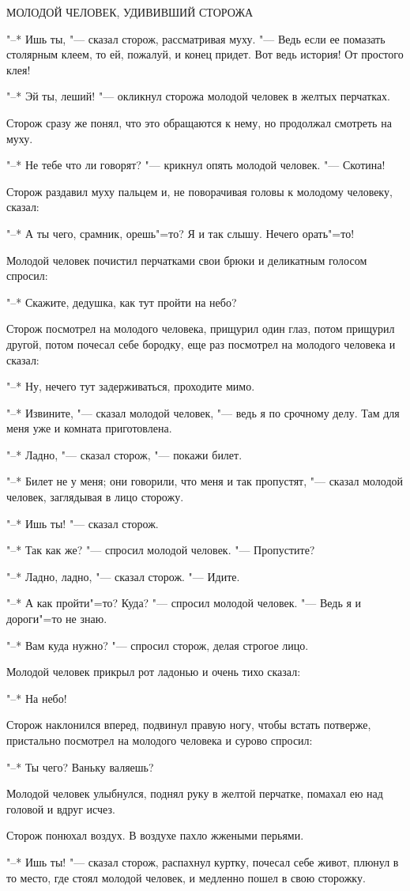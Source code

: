 МОЛОДОЙ  ЧЕЛОВЕК, УДИВИВШИЙ СТОРОЖА 

    "--* Ишь ты, "--- сказал сторож,  рассматривая 
муху. "--- Ведь если ее помазать столярным клеем, 
то ей, пожалуй, и конец придет. Вот ведь
история! От простого клея! 

    "--* Эй ты, леший! "--- окликнул сторожа молодой 
человек в желтых перчатках.

    Сторож сразу же понял, что это обращаются 
к нему, но продолжал смотреть на
муху. 

    "--* Не  тебе что  ли  говорят?  "---  крикнул
опять молодой человек. "--- Скотина! 

    Сторож раздавил муху пальцем и, не поворачивая 
головы к молодому человеку, сказал:

    "--* А ты чего, срамник, орешь"=то?  Я и так
слышу. Нечего орать"=то! 

    Молодой человек почистил перчатками свои
брюки и деликатным голосом спросил:

    "--* Скажите,  дедушка,  как  тут пройти на
небо? 

    Сторож  посмотрел  на молодого человека,
прищурил один глаз,  потом  прищурил другой,
потом почесал  себе бородку, еще раз посмотрел 
на молодого человека и сказал: 

    "--* Ну, нечего тут задерживаться, проходите мимо. 

    "--* Извините, "---  сказал молодой человек, "---
ведь я по срочному делу. Там для меня  уже и
комната приготовлена. 

    "--* Ладно, "--- сказал сторож, "--- покажи билет. 

    "--* Билет не у меня; они говорили, что меня 
и так пропустят, "--- сказал  молодой  человек, 
заглядывая в лицо сторожу. 

    "--* Ишь ты! "--- сказал сторож. 

    "--* Так как же? "--- спросил молодой человек.
"--- Пропустите? 

    "--* Ладно, ладно, "--- сказал сторож. "---  Идите. 

    "--* А как пройти"=то? Куда? "--- спросил молодой 
человек. "--- Ведь я и дороги"=то не знаю. 

    "--* Вам куда нужно? "--- спросил сторож, делая строгое лицо. 

    Молодой  человек  прикрыл  рот ладонью и
очень тихо сказал: 

    "--* На небо! 

    Сторож наклонился вперед, подвинул  правую 
ногу, чтобы  встать потверже, пристально
посмотрел  на  молодого  человека  и  сурово
спросил: 

    "--* Ты чего? Ваньку валяешь? 

    Молодой человек улыбнулся, поднял руку в
желтой  перчатке,  помахал  ею над головой и
вдруг исчез. 

    Сторож понюхал воздух.  В  воздухе пахло
жжеными перьями.

    "--* Ишь  ты!  "---  сказал  сторож, распахнул
куртку, почесал себе живот, плюнул в то место,  
где стоял молодой  человек,  и медленно
пошел в свою сторожку.